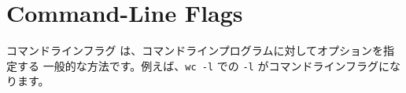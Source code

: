 \section{Command-Line Flags}

コマンドラインフラグ は、コマンドラインプログラムに対してオプションを指定する 一般的な方法です。例えば、\texttt{wc -l} での \texttt{-l} がコマンドラインフラグになります。




